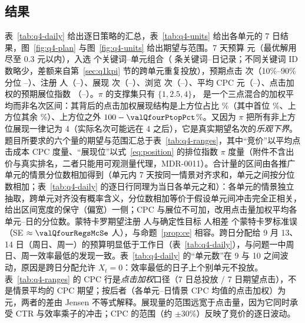 \subsection{结果}
\label{sec:q4res}
表~\ref{tab:q4-daily} 给出逐日策略的汇总，表~\ref{tab:q4-units} 给出各单元的 7 日结果，图~\ref{fig:q4-plan} 与图~\ref{fig:q4-units} 给出期望与范围。7 天预算 \valQfourBudget{} 元（最优解用尽至 0.3 元以内），入选 \valQfourSelectedKeywords{} 个关键词--单元组合（\valQfourRows{} 条关键词--日记录；不同关键词 ID 数略少，差额来自第~\ref{sec:q1kpi} 节的跨单元重复投放），预期点击 \valQfourClicksMean{} 次（10\%--90\% 分位 \valQfourClicksLow--\valQfourClicksHigh）、注册 \valQfourRegsMean{} 人（\valQfourRegsLow--\valQfourRegsHigh）、展现 \valQfourImpMean{} 次（\valQfourImpLow--\valQfourImpHigh）、浏览 \valQfourViewsMean{} 次（\valQfourViewsLow--\valQfourViewsHigh）、平均 CPC \valQfourCpcMean{} 元（\valQfourCpcLow--\valQfourCpcHigh）、点击加权的预期展位指数 \valQfourPositionMean（\valQfourPositionLow--\valQfourPositionHigh）。$\pi$ 的支撑集只有 $\{1,2.5,4\}$，\valQfourPositionMean{} 是一个三点混合的加权平均而非名次区间：其背后的点击加权展现结构是上方位占比 \valQfourPtopPct\%（其中首位 \valQfourPfirstPct\%、上方位其余 \valQfourPmidPct\%）、上方位之外 $100-\valQfourPtopPct$\%。又因为 $\pi$ 把所有非上方位展现一律记为 4（实际名次可能远在 4 之后），它是真实期望名次的\emph{乐观下界}。题目所要求的六个量的期望与范围汇总于表~\ref{tab:q4-ranges}，其中“竞价”以平均点击成本 CPC 度量、“展现位”以式~\eqref{eq:position} 的排位指数 $\pi$ 度量（附件不含出价与真实排名，二者只能用可观测量代理，MDR-0011）。合计量的区间由各推广单元的情景分位数相加得到（单元内 7 天按同一情景对齐求和，单元之间按分位数相加；表~\ref{tab:q4-daily} 的逐日行同理为当日各单元之和）：各单元的情景独立抽取，跨单元对齐没有概率含义，分位数相加等价于假设单元间冲击完全正相关，给出区间宽度的保守（偏宽）一侧；CPC 与展位不可加，改用点击量加权平均各单元--日的分位数。蒙特卡罗期望注册 \valQfourRegsMean{} 人与确定性目标 \valQfourDetRegs{} 人相差 \valQfourRegsMcZ{} 个蒙特卡罗标准误（SE $\approx\valQfourRegsMcSe$ 人），与命题~\ref{prop:ce} 相容。跨日分配给 9 月 13、14 日（周日、周一）的预算明显低于工作日（表~\ref{tab:q4-daily}），与问题一中周日、周一效率最低的发现一致。表~\ref{tab:q4-daily} 的“单元数”在 9 与 10 之间波动，原因是跨日分配允许 $X_t=0$：效率最低的日子上个别单元不投放。表~\ref{tab:q4-ranges} 的 CPC 行是\emph{点击加权}口径（7 日总投放 / 7 日期望点击），不是情景平均的 CPC 期望；按后者（各单元--日情景 CPC 均值的点击加权）为 \valQfourCpcScenarioMean{} 元，两者的差由 Jensen 不等式解释。展现量的范围远宽于点击量，因为它同时承受 CTR 与效率乘子的冲击；CPC 的范围（约 $\pm$30\%）反映了竞价的逐日波动。

